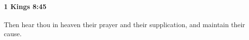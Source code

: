 
		\paragraph{1 Kings 8:45} %
			\label{1KINGS-8-45}

			Then hear thou in heaven their prayer and their supplication, and maintain their cause.


